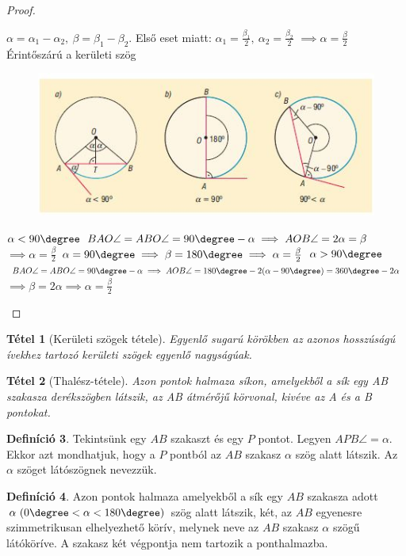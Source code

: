 \documentclass[twoside,12pt]{report}
\newtheorem{theorem}{Tétel}[section]
\theoremstyle{definition}
\newtheorem{definition}[theorem]{Definíció}
\begin{document}
\begin{proof}
\begin{outline}[enumerate]
\begin{figure}[H]
				\end{figure}
				\2 $\alpha=\alpha_1-\alpha_2,\ \beta=\beta_1-\beta_2$. Első eset miatt: $\alpha_1=\frac{\beta_1}{2},\ \alpha_2=\frac{\beta_2}{2}$
				\2 $\implies \alpha=\frac{\beta}{2}$
			\1 Érintőszárú a kerületi szög
				\begin{figure}[H]
					\centering
					\includegraphics[width=0.8\linewidth]{4sz}
				\end{figure}
				\2 $\alpha<90\degree$
					\3 $BAO\angle=ABO\angle=90\degree-\alpha\implies AOB\angle=2\alpha=\beta$
					\3 $\implies \alpha=\frac{\beta}{2}$
				\2 $\alpha=90\degree\implies\beta=180\degree\implies \alpha=\frac{\beta}{2}$
				\2 $\alpha>90\degree$
					\3  $BAO\angle=ABO\angle=90\degree-\alpha\implies AOB\angle= 180\degree- 2(\alpha-90\degree)=360\degree-2\alpha$
					\3 $\implies\beta=2\alpha\implies\alpha=\frac{\beta}{2}$ 
		\end{outline}
	\end{proof}
	\begin{theorem}[Kerületi szögek tétele]
		Egyenlő sugarú körökben az azonos hosszúságú ívekhez tartozó kerületi szögek egyenlő nagyságúak.
	\end{theorem}
	\begin{theorem}[Thalész-tétele]
		Azon pontok halmaza síkon, amelyekből a sík egy AB szakasza derékszögben látszik, az AB átmérőjű körvonal, kivéve az A és a B pontokat.
	\end{theorem}
	\begin{definition}
		Tekintsünk egy $AB$ szakaszt és egy $P$ pontot. Legyen $APB\angle=\alpha$. Ekkor azt mondhatjuk, hogy a $P$ pontból az $AB$ szakasz $\alpha$ szög alatt látszik. Az $\alpha$ szöget látószögnek nevezzük.
	\end{definition}
	\begin{definition}
		Azon pontok halmaza amelyekből a sík egy $AB$ szakasza adott $\alpha\  (0\degree<\alpha<180\degree)$ szög alatt látszik, két, az $AB$ egyenesre szimmetrikusan elhelyezhető körív, melynek neve az $AB$ szakasz $\alpha$ szögű látóköríve. A szakasz két végpontja nem tartozik a ponthalmazba.
	\end{definition}
\end{document}
